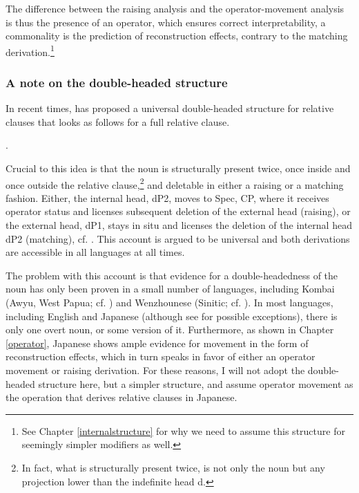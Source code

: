 \documentclass [output=book,colorlinks,citecolor=brown]{langscibook}
\begin{document}
The difference between the raising analysis and the operator-movement analysis is thus the presence of an operator, which ensures correct interpretability, a commonality is the prediction of reconstruction effects, contrary to the matching derivation.\footnote{See Chapter \ref{internalstructure} for why we need to assume this structure for seemingly simpler modifiers as well.}

\subsubsection{A note on the double-headed structure}

In recent times, \citet{cinque:2020:relcl} has proposed a universal double-headed structure for relative clauses that looks as follows for a full relative clause. %

\newpage

\ex. 

Crucial to this idea is that the noun is structurally present twice, once inside and once outside the relative clause,\footnote{In fact, what is structurally present twice, is not only the noun but any projection lower than the indefinite head d.} and deletable in either a raising or a matching fashion. Either, the internal head, dP2, moves to Spec, CP, where it receives operator status and licenses subsequent deletion of the external head (raising), or the external head, dP1, stays in situ and licenses the deletion of the internal head dP2 (matching), cf. \citet[25–45]{cinque:2020:relcl}. This account is argued to be universal and both derivations are accessible in all languages at all times. %

The problem with this account is that evidence for a double-headedness of the noun has only been proven in a small number of languages, including Kombai (Awyu, West Papua; cf. \citealt{vries:2020:greater}) and Wenzhounese (Sinitic; cf. \citealt{hu:2018:new}). In most languages, including English and Japanese (although see \citealt{erlewine:2016:unifying} for possible exceptions), there is only one overt noun, or some version of it. Furthermore, as shown in Chapter \ref{operator}, Japanese shows ample evidence for movement in the form of reconstruction effects, which in turn speaks in favor of either an operator movement or raising derivation. For these reasons, I will not adopt the double-headed structure here, but a simpler structure, and assume operator movement as the operation that derives relative clauses in Japanese.
\end{document}
